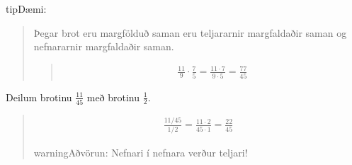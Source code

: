 \documentclass[a4paper,10pt,icelandic]{sphinxmanual}
\begin{document}
\begin{sphinxadmonition}{tip}{Dæmi:}
\begin{quote}
Þegar brot eru margfölduð saman eru teljararnir margfaldaðir saman og nefnararnir margfaldaðir saman.
\begin{quote}
\begin{equation*}
\begin{split}\frac{11}{9} \cdot \frac{7}{5}=\frac{11 \cdot 7}{9 \cdot 5}=\frac{77}{45}\end{split}
\end{equation*}\end{quote}
\end{quote}

 Deilum brotinu \(\frac{11}{45}\) með brotinu \(\frac{1}{2}\).
\begin{quote}
\begin{equation*}
\begin{split}\frac{11/45}{1/2}=\frac{11 \cdot 2}{45 \cdot 1}=\frac{22}{45}\end{split}
\end{equation*}
\begin{sphinxadmonition}{warning}{Aðvörun:}
Nefnari í nefnara verður teljari!
\end{sphinxadmonition}
\end{quote}
\end{sphinxadmonition}
\end{document}
